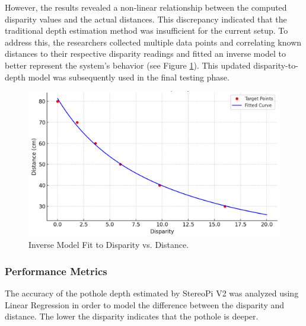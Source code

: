 However, the results revealed a non-linear relationship between the computed disparity values and the actual distances. This discrepancy indicated that the traditional depth estimation method was insufficient for the current setup. To address this, the researchers collected multiple data points and correlating known distances to their respective disparity readings and fitted an inverse model to better represent the system's behavior (see Figure \ref{fig:model}). This updated disparity-to-depth model was subsequently used in the final testing phase.

\begin{figure}[H]
	\centering
	\includegraphics[scale=0.55]{inversemodel.png}
	\caption{Inverse Model Fit to Disparity vs. Distance.\\}
	\label{fig:model}
\end{figure}




\subsubsection{Performance Metrics}
The accuracy of the pothole depth estimated by StereoPi V2 was analyzed using Linear Regression in order to model the difference between the disparity and distance. The lower the disparity indicates that the pothole is deeper.




